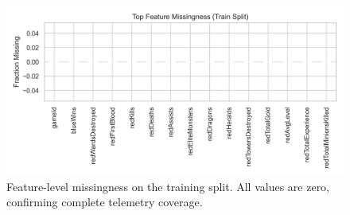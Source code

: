 \documentclass[aps,prl,preprint,groupedaddress]{revtex4-2}
\begin{document}
\begin{figure}[H]
    \centering
    \includegraphics[width=0.7\linewidth]{figures/eda/missingness.png}
    \caption{Feature-level missingness on the training split. All values are zero, confirming complete telemetry coverage.}
    \label{fig:missingness}
\end{figure}
\end{document}
